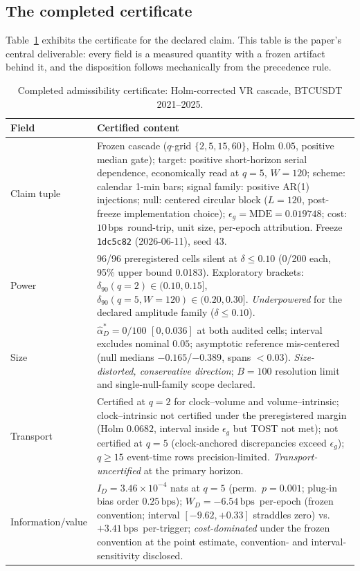 \documentclass[3p]{elsarticle}
\newcommand{\bps}{\ensuremath{\mathrm{bps}}}
\newcommand{\epsg}{\ensuremath{\epsilon_g}}
\newcommand{\dataspan}{2021--2025}
\begin{document}
\subsection{The completed certificate}
\label{sec:certificate-exhibit}

Table~\ref{tab:cert-filled} exhibits the certificate for the declared claim.
This table is the paper's central deliverable: every field is a measured
quantity with a frozen artifact behind it, and the disposition follows
mechanically from the precedence rule.

\begin{table}[htbp]
\centering
\begin{threeparttable}
\caption{Completed admissibility certificate: Holm-corrected VR cascade,
BTCUSDT \dataspan.}
\label{tab:cert-filled}
\small
\begin{tabularx}{\textwidth}{@{}lX@{}}
\toprule
Field & Certified content \\
\midrule
Claim tuple & Frozen cascade ($q$-grid $\{2,5,15,60\}$, Holm $0.05$, positive median gate); target: positive short-horizon serial dependence, economically read at $q{=}5$, $W{=}120$; scheme: calendar 1-min bars; signal family: positive AR(1) injections; null: centered circular block ($L{=}120$, post-freeze implementation choice); $\epsg=\mathrm{MDE}=0.019748$; cost: $10$\,\bps\ round-trip, unit size, per-epoch attribution. Freeze \texttt{1dc5c82} (2026-06-11), seed 43. \\
Power & 96/96 preregistered cells silent at $\delta\le0.10$ (0/200 each, 95\% upper bound 0.0183). Exploratory brackets: $\delta_{90}(q{=}2)\in(0.10,0.15]$, $\delta_{90}(q{=}5,W{=}120)\in(0.20,0.30]$. \emph{Underpowered} for the declared amplitude family ($\delta\le0.10$). \\
Size & $\widehat{\alpha}_D^\ast=0/100$ $[0,0.036]$ at both audited cells; interval excludes nominal $0.05$; asymptotic reference mis-centered (null medians $-0.165$/$-0.389$, spans $<0.03$). \emph{Size-distorted, conservative direction}; $B=100$ resolution limit and single-null-family scope declared. \\
Transport & Certified at $q{=}2$ for clock--volume and volume--intrinsic; clock--intrinsic not certified under the preregistered margin (Holm $0.0682$, interval inside $\epsg$ but TOST not met); not certified at $q{=}5$ (clock-anchored discrepancies exceed $\epsg$); $q\ge15$ event-time rows precision-limited. \emph{Transport-uncertified} at the primary horizon. \\
Information/value & $I_D=3.46\times10^{-4}$ nats at $q{=}5$ (perm.\ $p=0.001$; plug-in bias order $0.25$\,\bps); $W_D=-6.54$\,\bps\ per-epoch (frozen convention; interval $[-9.62,+0.33]$ straddles zero) vs.\ $+3.41$\,\bps\ per-trigger; \emph{cost-dominated} under the frozen convention at the point estimate, convention- and interval-sensitivity disclosed. \\

\end{tabularx}
\end{threeparttable}
\end{table}
\end{document}

